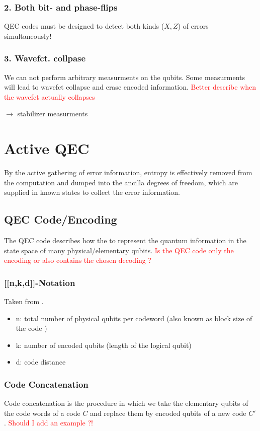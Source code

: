 \subsubsection{2. Both bit- and phase-flips}
QEC codes must be designed to detect both kinds ($X,Z$) of errors simultaneously!


\subsubsection{3. Wavefct. collpase}
We can not perform arbitrary measurments on the qubits. 
Some measurments will lead to wavefct collapse and erase encoded information.
\textcolor{red}{Better describe when the wavefct actually collapses}

$\rightarrow$ stabilizer measurments


\section{Active QEC}
By the active gathering of error information, entropy is effectively removed from the computation and dumped into the ancilla degrees of freedom, which are supplied in known states to collect the error information. \cite{QECmemory}


\subsection{QEC Code/Encoding}
The QEC code describes how the to represent the quantum information in the state space of many physical/elementary qubits. \cite{QECmemory}
\textcolor{red}{Is the QEC code only the encoding or also contains the chosen decoding ?}


\subsubsection{[[n,k,d]]-Notation}\label{sssec:nkd_notation}
Taken from \cite{QECintro}.
\begin{itemize}
    \item n: total number of physical qubits per codeword (also known as block size of the code \cite{QECmemory})
    \item k: number of encoded qubits (length of the logical qubit)
    \item d: code distance
\end{itemize}


\subsubsection{Code Concatenation}
Code concatenation is the procedure in which we take the elementary qubits of the code words of a code $C$ and replace them by encoded qubits of a new code $C'$. \cite{QECmemory}
\textcolor{red}{Should I add an example ?!}


